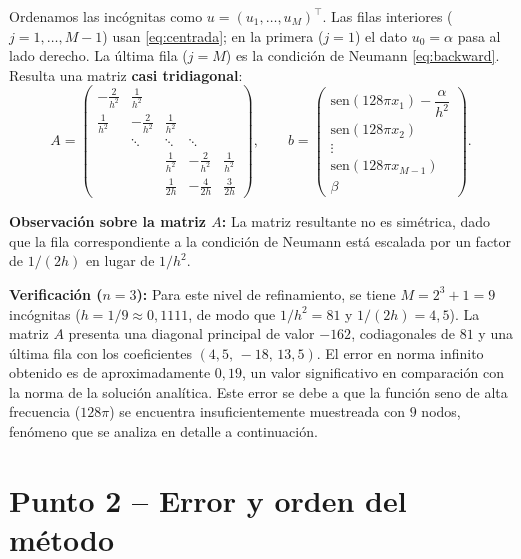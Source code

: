 \documentclass[]{report}
\begin{document}
Ordenamos las incógnitas como $u=(u_1,\dots,u_M)^\top$. Las filas interiores
($j=1,\dots,M-1$) usan \eqref{eq:centrada}; en la primera ($j=1$) el dato $u_0=\alpha$
pasa al lado derecho. La última fila ($j=M$) es la condición de Neumann
\eqref{eq:backward}. Resulta una matriz \textbf{casi tridiagonal}:
\begin{equation}
A=\begin{pmatrix}
-\frac{2}{h^2} & \frac{1}{h^2} & & & \\[2pt]
\frac{1}{h^2} & -\frac{2}{h^2} & \frac{1}{h^2} & & \\[2pt]
 & \ddots & \ddots & \ddots & \\[2pt]
 & & \frac{1}{h^2} & -\frac{2}{h^2} & \frac{1}{h^2}\\[2pt]
 & & \frac{1}{2h} & -\frac{4}{2h} & \frac{3}{2h}
\end{pmatrix},
\qquad
b=\begin{pmatrix}
\text{sen}(128\pi x_1)-\dfrac{\alpha}{h^2}\\[4pt]
\text{sen}(128\pi x_2)\\
\vdots\\
\text{sen}(128\pi x_{M-1})\\[2pt]
\beta
\end{pmatrix}.
\label{eq:sistema}
\end{equation}

\textbf{Observación sobre la matriz $A$:} La matriz resultante no es simétrica, dado que la fila correspondiente a la condición de Neumann está escalada por un factor de $1/(2h)$ en lugar de $1/h^2$.

\textbf{Verificación ($n=3$):} Para este nivel de refinamiento, se tiene $M=2^3+1=9$ incógnitas ($h=1/9\approx0{,}1111$, de modo que $1/h^2=81$ y $1/(2h)=4{,}5$). La matriz $A$ presenta una diagonal principal de valor $-162$, codiagonales de $81$ y una última fila con los coeficientes $(4{,}5,\,-18,\,13{,}5)$. El error en norma infinito obtenido es de aproximadamente $0{,}19$, un valor significativo en comparación con la norma de la solución analítica. Este error se debe a que la función seno de alta frecuencia ($128\pi$) se encuentra insuficientemente muestreada con $9$ nodos, fenómeno que se analiza en detalle a continuación.

\section*{Punto 2 -- Error y orden del método}
\end{document}
